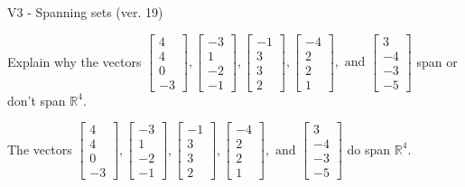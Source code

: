 \begin{exercise}
  \begin{exerciseTitle}V3 - Spanning sets (ver. 19)\end{exerciseTitle}
  \begin{exerciseStatement}
    Explain why the vectors \(\left[\begin{array}{r}
4 \\
4 \\
0 \\
-3
\end{array}\right] , \left[\begin{array}{r}
-3 \\
1 \\
-2 \\
-1
\end{array}\right] , \left[\begin{array}{r}
-1 \\
3 \\
3 \\
2
\end{array}\right] , \left[\begin{array}{r}
-4 \\
2 \\
2 \\
1
\end{array}\right] , \text{ and } \left[\begin{array}{r}
3 \\
-4 \\
-3 \\
-5
\end{array}\right]\) span or don't span \(\mathbb{R}^4\). 
	


  \end{exerciseStatement}
  \begin{exerciseAnswer}
   The vectors \(\left[\begin{array}{r}
4 \\
4 \\
0 \\
-3
\end{array}\right] , \left[\begin{array}{r}
-3 \\
1 \\
-2 \\
-1
\end{array}\right] , \left[\begin{array}{r}
-1 \\
3 \\
3 \\
2
\end{array}\right] , \left[\begin{array}{r}
-4 \\
2 \\
2 \\
1
\end{array}\right] , \text{ and } \left[\begin{array}{r}
3 \\
-4 \\
-3 \\
-5
\end{array}\right]\) 
  	 do  
	span \(\mathbb{R}^4\).
  



\end{exerciseAnswer}
\end{exercise}
